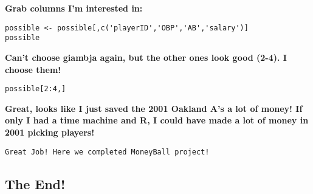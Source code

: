 \documentclass[
]{article}
\begin{document}
\textbf{Grab columns I'm interested in:}

\begin{verbatim}
possible <- possible[,c('playerID','OBP','AB','salary')]
possible
\end{verbatim}

\textbf{Can't choose giambja again, but the other ones look good (2-4).
I choose them!}

\begin{verbatim}
possible[2:4,]
\end{verbatim}

\textbf{Great, looks like I just saved the 2001 Oakland A's a lot of
money! If only I had a time machine and R, I could have made a lot of
money in 2001 picking players!}

\texttt{Great\ Job!\ Here\ we\ completed\ MoneyBall\ project!}

\hypertarget{the-end}{%
\subsection{The End!}\label{the-end}}
\end{document}
